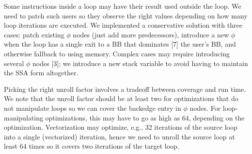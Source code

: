 Some instructions inside a loop may have their result used outside the
loop. We need to patch such users so they observe the right values
depending on how many loop iterations are executed. We implemented a
conservative solution with three cases: patch existing $\phi$ nodes
(just add more predecessors), introduce a new $\phi$ when the loop has
a single exit to a BB that dominates [7] the user’s BB, and otherwise
fallback to using memory. Complex cases may require introducing
several $\phi$ nodes [3]; we introduce a new stack variable to avoid
having to maintain the SSA form altogether.


Picking the right unroll factor involves a tradeoff between coverage
and run time. We note that the unroll factor should be at least two
for optimizations that do not manipulate loops so we can cover the
backedge entry in $\phi$ nodes. For loop-manipulating optimizations,
this may have to go as high as 64, depending on the optimization.
Vectorization may optimize, e.g., 32 iterations of the source loop
into a single (vectorized) iteration, hence we need to unroll the
source loop at least 64 times so it covers two iterations of the
target loop.
